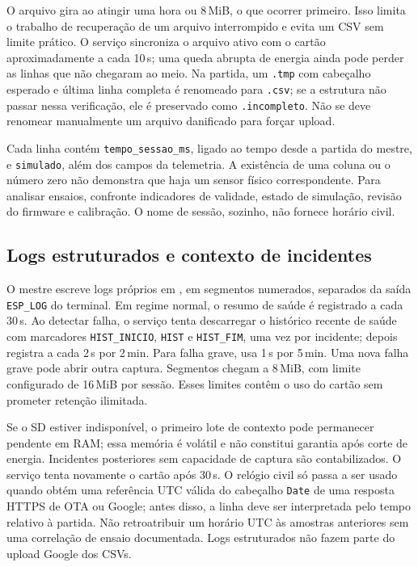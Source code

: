 O arquivo gira ao atingir uma hora ou 8\,MiB, o que ocorrer primeiro. Isso limita o trabalho de recuperação de um arquivo interrompido e evita um CSV sem limite prático. O serviço sincroniza o arquivo ativo com o cartão aproximadamente a cada 10\,s; uma queda abrupta de energia ainda pode perder as linhas que não chegaram ao meio. Na partida, um \texttt{.tmp} com cabeçalho esperado e última linha completa é renomeado para \texttt{.csv}; se a estrutura não passar nessa verificação, ele é preservado como \texttt{.incompleto}. Não se deve renomear manualmente um arquivo danificado para forçar upload.

Cada linha contém \texttt{tempo\_sessao\_ms}, ligado ao tempo desde a partida do mestre, e \texttt{simulado}, além dos campos da telemetria. A existência de uma coluna ou o número zero não demonstra que haja um sensor físico correspondente. Para analisar ensaios, confronte indicadores de validade, estado de simulação, revisão do firmware e calibração. O nome de sessão, sozinho, não fornece horário civil.

\subsection{Logs estruturados e contexto de incidentes}
O mestre escreve logs próprios em , em segmentos numerados, separados da saída \texttt{ESP\_LOG} do terminal. Em regime normal, o resumo de saúde é registrado a cada 30\,s. Ao detectar falha, o serviço tenta descarregar o histórico recente de saúde com marcadores \texttt{HIST\_INICIO}, \texttt{HIST} e \texttt{HIST\_FIM}, uma vez por incidente; depois registra a cada 2\,s por 2\,min. Para falha grave, usa 1\,s por 5\,min. Uma nova falha grave pode abrir outra captura. Segmentos chegam a 8\,MiB, com limite configurado de 16\,MiB por sessão. Esses limites contêm o uso do cartão sem prometer retenção ilimitada.

Se o SD estiver indisponível, o primeiro lote de contexto pode permanecer pendente em RAM; essa memória é volátil e não constitui garantia após corte de energia. Incidentes posteriores sem capacidade de captura são contabilizados. O serviço tenta novamente o cartão após 30\,s. O relógio civil só passa a ser usado quando obtém uma referência UTC válida do cabeçalho \texttt{Date} de uma resposta HTTPS de OTA ou Google; antes disso, a linha deve ser interpretada pelo tempo relativo à partida. Não retroatribuir um horário UTC às amostras anteriores sem uma correlação de ensaio documentada. Logs estruturados não fazem parte do upload Google dos CSVs.

